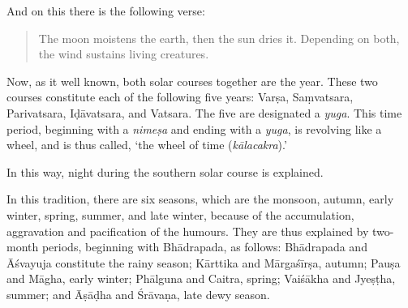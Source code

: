 \begin{translation}
\item [7] 
And on this there is the following verse:
\begin{quote}
The moon moistens the earth, then the sun dries it.  Depending on both, %
the wind sustains living creatures. 
\end{quote}

\item [8] 
Now, as it well known, both solar courses %
together %
are the year. %
These two courses %
constitute %
each of the following five years: %
Varṣa, Saṃvatsara, Parivatsara, Iḍāvatsara, and Vatsara. %
The five are designated %
a \emph{yuga}. %
This time period, beginning with a \emph{nimeṣa} and ending with a \emph{yuga}, is revolving like a wheel, and is thus called, `the wheel of time (\emph{kālacakra}).' 

\item [9] 
In this way, night during the southern solar course is explained. %

\item [10] 
In this tradition, %
there are six seasons, which are the monsoon, autumn, early winter, spring, summer, and late winter, because of the accumulation, aggravation and pacification of the humours. 
They are thus explained %
by two-month periods, %
beginning with Bhādrapada, %
as follows: %
Bhādrapada and Āśvayuja constitute the rainy season; Kārttika and Mārgaśīrṣa, autumn; Pauṣa and Māgha, early winter; Phālguna and Caitra, spring; Vaiśākha and Jyeṣṭha, summer; and Āṣāḍha and Śrāvaṇa, late dewy season.


\end{translation}

